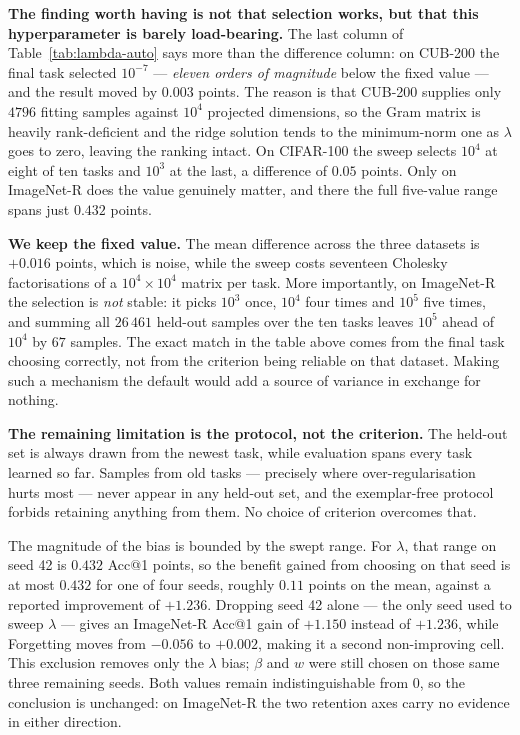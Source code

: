 \documentclass[11pt,a4paper]{article}
\begin{document}
\textbf{The finding worth having is not that selection works, but that this
hyperparameter is barely load-bearing.} The last column of
Table~\ref{tab:lambda-auto} says more than the difference column: on CUB-200 the
final task selected $10^{-7}$ --- \emph{eleven orders of magnitude} below the
fixed value --- and the result moved by $0.003$ points. The reason is that
CUB-200 supplies only $4796$ fitting samples against $10^4$ projected
dimensions, so the Gram matrix is heavily rank-deficient and the ridge solution
tends to the minimum-norm one as $\lambda$ goes to zero, leaving the ranking
intact. On CIFAR-100 the sweep selects $10^4$ at eight of ten tasks and $10^3$ at
the last, a difference of $0.05$ points. Only on ImageNet-R does the value
genuinely matter, and there the full five-value range spans just $0.432$ points.

\textbf{We keep the fixed value.} The mean difference across the three datasets
is $+0.016$ points, which is noise, while the sweep costs seventeen Cholesky
factorisations of a $10^4 \times 10^4$ matrix per task. More importantly, on
ImageNet-R the selection is \emph{not} stable: it picks $10^3$ once, $10^4$ four
times and $10^5$ five times, and summing all $26\,461$ held-out samples over the
ten tasks leaves $10^5$ ahead of $10^4$ by $67$ samples. The exact match in the
table above comes from the final task choosing correctly, not from the criterion
being reliable on that dataset. Making such a mechanism the default would add a
source of variance in exchange for nothing.

\textbf{The remaining limitation is the protocol, not the criterion.} The
held-out set is always drawn from the newest task, while evaluation spans every
task learned so far. Samples from old tasks --- precisely where over-regularisation
hurts most --- never appear in any held-out set, and the exemplar-free protocol
forbids retaining anything from them. No choice of criterion overcomes that.

The magnitude of the bias is bounded by the swept range. For $\lambda$, that
range on seed 42 is $0.432$ Acc@1 points, so the benefit gained from choosing on
that seed is at most $0.432$ for one of four seeds, roughly $0.11$ points on the
mean, against a reported improvement of $+1.236$. Dropping seed 42 alone --- the
only seed used to sweep $\lambda$ --- gives an ImageNet-R Acc@1 gain of $+1.150$
instead of $+1.236$, while Forgetting moves from $-0.056$ to $+0.002$, making it
a second non-improving cell. This exclusion removes only the $\lambda$ bias;
$\beta$ and $w$ were still chosen on those same three remaining seeds. Both
values remain indistinguishable from $0$, so the conclusion is unchanged: on
ImageNet-R the two retention axes carry no evidence in either direction.
\end{document}

